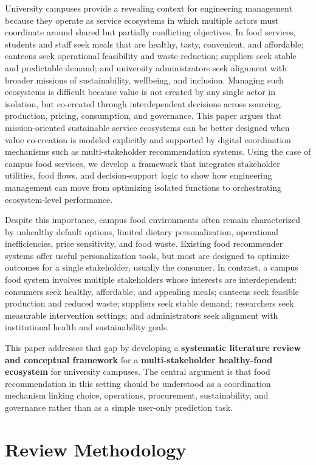 \documentclass[
  letterpaper,
  DIV=11,
  numbers=noendperiod]{scrartcl}
\begin{document}
University campuses provide a revealing context for engineering
management because they operate as service ecosystems in which multiple
actors must coordinate around shared but partially conflicting
objectives. In food services, students and staff seek meals that are
healthy, tasty, convenient, and affordable; canteens seek operational
feasibility and waste reduction; suppliers seek stable and predictable
demand; and university administrators seek alignment with broader
missions of sustainability, wellbeing, and inclusion. Managing such
ecosystems is difficult because value is not created by any single actor
in isolation, but co-created through interdependent decisions across
sourcing, production, pricing, consumption, and governance. This paper
argues that mission-oriented sustainable service ecosystems can be
better designed when value co-creation is modeled explicitly and
supported by digital coordination mechanisms such as multi-stakeholder
recommendation systems. Using the case of campus food services, we
develop a framework that integrates stakeholder utilities, food flows,
and decision-support logic to show how engineering management can move
from optimizing isolated functions to orchestrating ecosystem-level
performance.

Despite this importance, campus food environments often remain
characterized by unhealthy default options, limited dietary
personalization, operational inefficiencies, price sensitivity, and food
waste. Existing food recommender systems offer useful personalization
tools, but most are designed to optimize outcomes for a single
stakeholder, usually the consumer. In contrast, a campus food system
involves multiple stakeholders whose interests are interdependent:
consumers seek healthy, affordable, and appealing meals; canteens seek
feasible production and reduced waste; suppliers seek stable demand;
researchers seek measurable intervention settings; and administrators
seek alignment with institutional health and sustainability goals.

This paper addresses that gap by developing a \textbf{systematic
literature review and conceptual framework} for a
\textbf{multi-stakeholder healthy-food ecosystem} for university
campuses. The central argument is that food recommendation in this
setting should be understood as a coordination mechanism linking choice,
operations, procurement, sustainability, and governance rather than as a
simple user-only prediction task.

\section{Review Methodology}\label{review-methodology}
\end{document}
